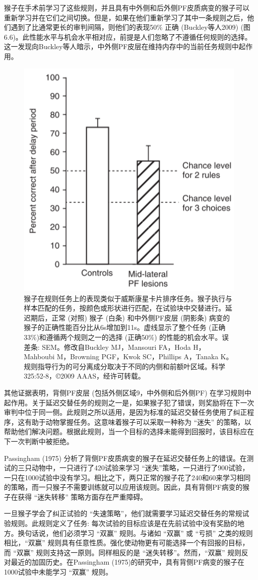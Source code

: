 猴子在手术前学习了这些规则，并且具有中外侧和后外侧PF皮质病变的猴子可以重新学习并在它们之间切换。但是，如果在他们重新学习了其中一条规则之后，他们遇到了比通常更长的审判间隔，则他们的表现50\% 正确 (Buckley等人2009) (图6.6)。此性能水平与机会水平相对应，前提是人们忽略了不遵循任何规则的选择。这一发现向Buckley等人暗示，中外侧PF皮层在维持内存中的当前任务规则中起作用。
\begin{figure}
	\centering
	\includegraphics[width=0.5\linewidth]{image_pfc/Fig_6_6}
	\caption{猴子在规则任务上的表现类似于威斯康星卡片排序任务。猴子执行与样本匹配的任务，按颜色或形状进行匹配，在试验块中交替进行。延迟期后，正常 (对照) 猴子 (白条) 和中外侧PF皮层 (阴影条) 病变的猴子的正确性能百分比从6s增加到11s。虚线显示了整个任务 (正确33\%)和遵循两个规则之一的选择 (正确50\%) 的性能的机会水平。误差条: SEM。修改自Buckley MJ，Mansouri FA，Hoda H，Mahboubi M，Browning PGF，Kwok SC，Phillips A，Tanaka K。规则指导行为的可分离成分取决于不同的内侧和前额叶区域。科学325:52-8，©2009 AAAS，经许可转载。}
	\label{fig:fig}
\end{figure}
其他证据表明，背侧PF皮层 (包括外侧区域9，中外侧和后外侧PF) 在学习规则中起作用。关于延迟交替任务的规则之一是，如果猴子犯了错误，则奖励将在下一次审判中位于同一侧。此规则之所以适用，是因为标准的延迟交替任务使用了纠正程序，这有助于动物掌握任务。这意味着猴子可以采取一种称为 “迷失” 的策略，以帮助他们解决问题。根据此规则，当一个目标的选择未能得到回报时，该目标应在下一次判断中被拒绝。

Passingham (1975) 分析了背侧PF皮质病变的猴子在延迟交替任务上的错误。在测试的三只动物中，一只进行了420试验来学习 “迷失”策略，一只进行了900试验，一只在1000试验中没有学习。相比之下，两只正常的猴子花了240和60来学习相同的策略，而一只猴子不需要训练就可以应用该规则。因此，具有背侧PF病变的猴子在获得 “迷失转移” 策略方面存在严重障碍。

一旦猴子学会了纠正试验的 “失速策略”，他们就需要学习延迟交替任务的常规试验规则。此规则定义了任务: 每次试验的目标应该是在先前试验中没有奖励的地方。换句话说，他们必须学习 “双赢” 规则。与诸如 “双赢” 或 “亏损” 之类的规则相比，“双赢” 规则具有任意性质。强化使动物更有可能选择一个有回报的目标，而 “双赢” 规则支持这一原则。同样相反的是 “迷失转移”。然而，“双赢” 规则反对最近的加固历史。在Passingham (1975)的研究中，具有背侧PF病变的猴子在1000试验中未能学习 “双赢” 规则。
